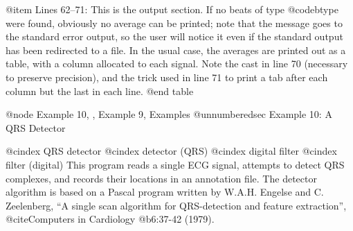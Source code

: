 {{{{{{{{{{@item Lines 62--71:
This is the output section.  If no beats of type @code{btype} were
found, obviously no average can be printed; note that the message goes
to the standard error output, so the user will notice it even if the
standard output has been redirected to a file.  In the usual case, the
averages are printed out as a table, with a column allocated to each
signal.  Note the cast in line 70 (necessary to preserve precision), and
the trick used in line 71 to print a tab after each column but the last
in each line.
@end table

@node     Example 10, , Example 9, Examples
@unnumberedsec Example 10: A QRS Detector

@cindex QRS detector
@cindex detector (QRS)
@cindex digital filter
@cindex filter (digital)
This program reads a single ECG signal, attempts to detect QRS complexes,
and records their locations in an annotation file.  The detector algorithm
is based on a Pascal program written by W.A.H. Engelse and C. Zeelenberg,
``A single scan algorithm for QRS-detection and feature extraction'',
@cite{Computers in Cardiology} @b{6}:37-42 (1979).

}}}}}}}}}}
